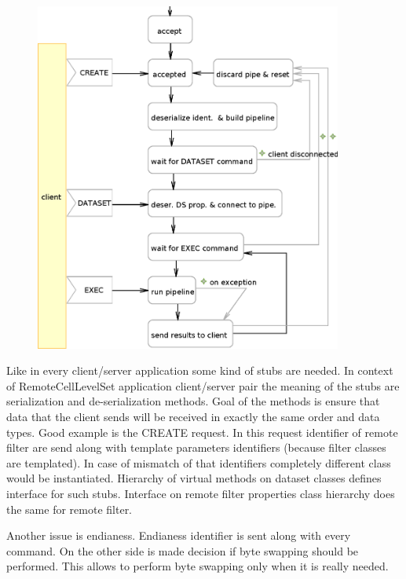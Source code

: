 \begin{figure}
    \centering
    \includegraphics[width=0.9\textwidth]{data/RCServerCycle}
    \caption[MedV4D server cycle]{}
    \label{fg:RCServerCycle}
\end{figure}

Like in every client/server application some kind of stubs are needed.
In context of RemoteCellLevelSet application client/server pair the meaning of the stubs are serialization and de-serialization methods.
Goal of the methods is ensure that data that the client sends will be received in exactly the same order and data types.
Good example is the CREATE request.
In this request identifier of remote filter are send along with template parameters identifiers (because filter classes are templated).
In case of mismatch of that identifiers completely different class would be instantiated.
Hierarchy of virtual methods on dataset classes defines interface for such stubs.
Interface on remote filter properties class hierarchy does the same for remote filter.

Another issue is endianess.
Endianess identifier is sent along with every command. On the other side is made decision if byte swapping should be performed.
This allows to perform byte swapping only when it is really needed.

